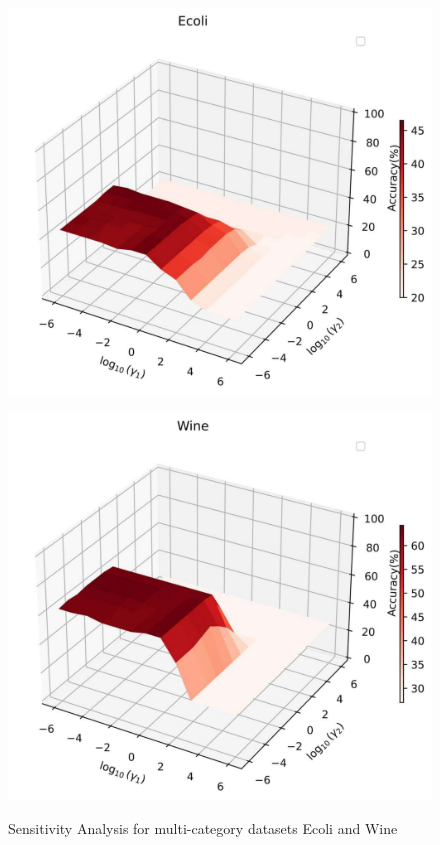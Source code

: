 \documentclass[12pt,a4paper,oneside,english]{report}
\begin{document}
\begin{figure}[t!]
    \begin{minipage}[t]{0.5\textwidth}
        \centering
        \includegraphics[width=0.9\linewidth]{Figures/chp4/ablation/ecoli_gamma.pdf}
        \label{fig:ecoli_gamma}
    \end{minipage}%
    \begin{minipage}[t]{0.5\textwidth}
        \centering
        \includegraphics[width=0.9\linewidth]{Figures/chp4/ablation/wine_gamma.pdf}
        \label{fig:wine_gamma}
    \end{minipage}

    \caption{Sensitivity Analysis for multi-category datasets Ecoli and Wine}
    \label{sens_multi}
\end{figure}
 
\end{document}
